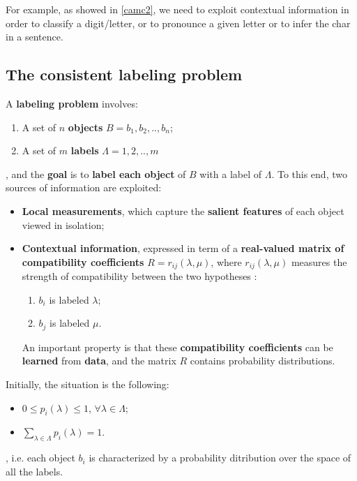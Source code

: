 For example, as showed in \ref{camc2}, we need to exploit contextual information in order to classify a digit/letter, or to pronounce a given letter or to infer the char in a sentence.

\subsection{The consistent labeling problem}
A \textbf{labeling problem} involves:

\begin{enumerate}
    \item A set of $n$ \textbf{objects} $B = {b_1, b_2, .., b_n}$;
    \item A set of $m$ \textbf{labels} $\Lambda = {1, 2, .., m}$
\end{enumerate}

, and the \textbf{goal} is to \textbf{label each object} of $B$ with a label of $\Lambda$. To this end, two sources of information are exploited:

\begin{itemize}
    \item \textbf{Local measurements}, which capture the \textbf{salient features} of each object viewed in isolation;
    \item \textbf{Contextual information}, expressed in term of a \textbf{real-valued matrix of compatibility coefficients} $R = {r_{ij}(\lambda, \mu)}$, where $r_{ij}(\lambda, \mu)$ measures the strength of compatibility between the two hypotheses :
    \begin{enumerate}
        \item $b_i$ is labeled $\lambda$;
        \item $b_j$ is labeled $\mu$.
    \end{enumerate}
    An important property is that these \textbf{compatibility coefficients} can be \textbf{learned} from \textbf{data}, and the matrix $R$ contains probability distributions.
\end{itemize}

Initially, the situation is the following:

\begin{itemize}
    \item $0 \leq p_i(\lambda) \leq 1$, $\forall \lambda \in \Lambda$;
    \item $\sum_{\lambda \in \Lambda} p_i(\lambda) = 1$.
\end{itemize}

, i.e. each object $b_i$ is characterized by a probability ditribution over the space of all the labels.

